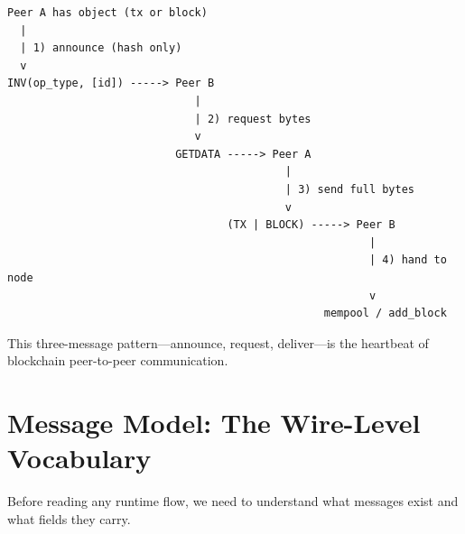 \begin{verbatim}
Peer A has object (tx or block)
  |
  | 1) announce (hash only)
  v
INV(op_type, [id]) -----> Peer B
                             |
                             | 2) request bytes
                             v
                          GETDATA -----> Peer A
                                           |
                                           | 3) send full bytes
                                           v
                                  (TX | BLOCK) -----> Peer B
                                                        |
                                                        | 4) hand to node
                                                        v
                                                 mempool / add_block
\end{verbatim}

This three-message pattern---announce, request, deliver---is the heartbeat of blockchain peer-to-peer communication.

\section{Message Model: The Wire-Level Vocabulary}
\label{sec:ch12-message-model}

Before reading any runtime flow, we need to understand what messages exist and what fields they carry.

